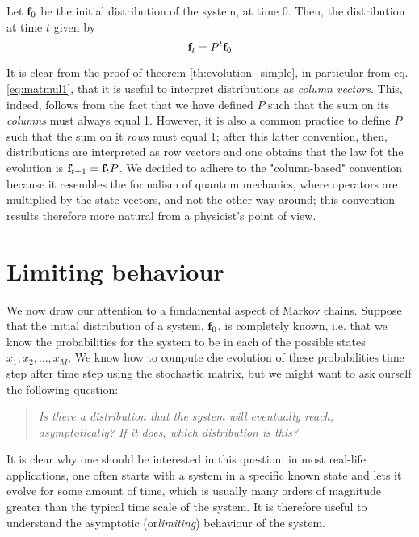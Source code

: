 \begin{corollary} \label{th:evolution_complete}
    Let $\mathbf{f}_0$ be the initial distribution of the system, at time 0. Then, the distribution at time $t$ given by
    \begin{equation}
        \mathbf{f}_t = P^t \mathbf{f}_0
    \end{equation}
\end{corollary}

\begin{remark}
    It is clear from the proof of theorem \ref{th:evolution_simple}, in particular from eq. \ref{eq:matmul1}, that it is useful to interpret distributions as \emph{column vectors}. This, indeed, follows from the fact that we have defined $P$ such that the sum on its \emph{columns} must always equal 1. However, it is also a common practice to define $P$ such that the sum on it \emph{rows} must equal 1; after this latter convention, then, distributions are interpreted as row vectors and one obtains that the law fot the evolution is $\mathbf{f}_{t+1} = \mathbf{f}_t P$. We decided to adhere to the "column-based" convention because it resembles the formalism of quantum mechanics, where operators are multiplied by the state vectors, and not the other way around; this convention results therefore more natural from a physicist's point of view.
\end{remark}

\section{Limiting behaviour}
We now draw our attention to a fundamental aspect of Markov chains. Suppose that the initial distribution of a system, $\mathbf{f}_0$, is completely known, i.e. that we know the probabilities for the system to be in each of the possible states $x_1, x_2, \dots, x_M$. We know how to compute che evolution of these probabilities time step after time step using the stochastic matrix, but we might want to ask ourself the following question: 
\begin{quote}
    \emph{Is there a distribution that the system will eventually reach, asymptotically? If it does, which distribution is this?}
\end{quote}

It is clear why one should be interested in this question: in most real-life applications, one often starts with a system in a specific known state and lets it evolve for some amount of time, which is usually many orders of magnitude greater than the typical time scale of the system. It is therefore useful to understand the asymptotic (or\emph{limiting}) behaviour of the system.

